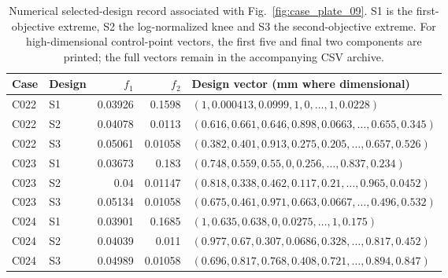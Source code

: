 \begin{table}[p]
\centering\scriptsize
\caption{Numerical selected-design record associated with Fig.~\ref{fig:case_plate_09}. S1 is the first-objective extreme, S2 the log-normalized knee and S3 the second-objective extreme. For high-dimensional control-point vectors, the first five and final two components are printed; the full vectors remain in the accompanying CSV archive.}
\label{tab:case_plate_09}
\setlength{\tabcolsep}{3.2pt}
\begin{tabularx}{\textwidth}{llrr>{\raggedright\arraybackslash}X}
\toprule Case & Design & $f_1$ & $f_2$ & Design vector (mm where dimensional) \\
\midrule
C022 & S1 & 0.03926 & 0.1598 & $(1, 0.000413, 0.0999, 1, 0, \ldots, 1, 0.0228)$ \\
C022 & S2 & 0.04078 & 0.0113 & $(0.616, 0.661, 0.646, 0.898, 0.0663, \ldots, 0.655, 0.345)$ \\
C022 & S3 & 0.05061 & 0.01058 & $(0.382, 0.401, 0.913, 0.275, 0.205, \ldots, 0.657, 0.526)$ \\
C023 & S1 & 0.03673 & 0.183 & $(0.748, 0.559, 0.55, 0, 0.256, \ldots, 0.837, 0.234)$ \\
C023 & S2 & 0.04 & 0.01147 & $(0.818, 0.338, 0.462, 0.117, 0.21, \ldots, 0.965, 0.0452)$ \\
C023 & S3 & 0.05134 & 0.01058 & $(0.675, 0.461, 0.971, 0.663, 0.0667, \ldots, 0.496, 0.532)$ \\
C024 & S1 & 0.03901 & 0.1685 & $(1, 0.635, 0.638, 0, 0.0275, \ldots, 1, 0.175)$ \\
C024 & S2 & 0.04039 & 0.011 & $(0.977, 0.67, 0.307, 0.0686, 0.328, \ldots, 0.817, 0.452)$ \\
C024 & S3 & 0.04989 & 0.01058 & $(0.696, 0.817, 0.768, 0.408, 0.721, \ldots, 0.894, 0.847)$ \\
\bottomrule
\end{tabularx}
\end{table}
